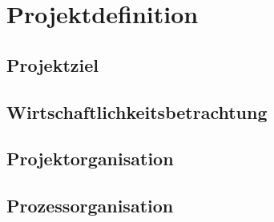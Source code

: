 
\chapter{Projektdefinition}
	
	\section{Projektziel}
	
	\section{Wirtschaftlichkeitsbetrachtung}
	
	\section{Projektorganisation}
	
	\section{Prozessorganisation}